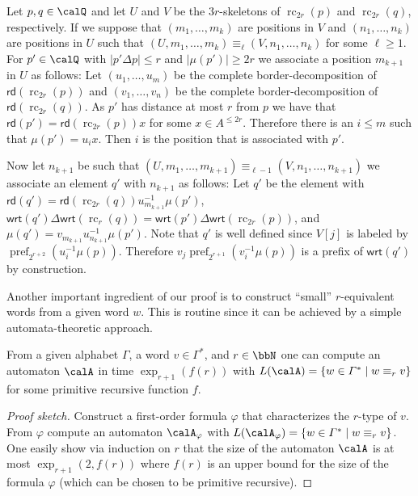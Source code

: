 \documentclass[a4paper,numberwithinsect,USenglish]{lipics-v2018}
\theoremstyle{plain}
\theoremstyle{remark}
\DeclareMathOperator{\pref}{pref}
\DeclareMathOperator{\cpr}{rc}
\newcommand{\rd}[1]{\mathsf{rd}(#1)}
\newcommand{\wrt}[1]{\mathsf{wrt}(#1)}
\newcommand{\Qx}{\calQ}
\newcommand{\mddl}[1]{\mu(#1)}
\renewcommand{\phi}{\varphi}
\renewcommand{\Gamma}{\varGamma}
\begin{document}
\begin{definition}
	Let $p,q\in \Qx$ and let $U$ and $V$ be the $3r$-skeletons of $\cpr_{2r}(p)$ and $\cpr_{2r}(q)$, respectively. If we suppose that $(m_1,\ldots,m_k)$ are positions in $V$ and $(n_1,\ldots,n_k)$ are positions in $U$ such that $(U,m_1,\ldots,m_k) \equiv_{\ell} (V,n_1,\ldots,n_k)$ for some $\ell \geq 1$. For $p'\in \Qx$ with $|p'\Delta p| \leq r$ and $|\mu(p')| \geq 2r$ we associate a position $m_{k+1}$ in $U$ as follows:
	Let $(u_1,\ldots, u_m)$ be the complete border-decomposition of $\rd{\cpr_{2r}(p)}$ and $(v_1,\ldots,v_n)$ be the complete border-decomposition of $\rd{\cpr_{2r}(q)}$. As $p'$ has distance at most $r$ from $p$ we have that $\rd{p'} = \rd{\cpr_{2r}(p)}x$
	for some $x\in A^{\leq 2r}$. Therefore there is an $i\leq m$ such that $\mddl{p'} = u_ix$. Then $i$ is the position that is associated with $p'$.
	
	Now let $n_{k+1}$ be such that $(U,m_1,\ldots,m_{k+1}) \equiv_{\ell-1} (V,n_1,\ldots,n_{k+1})$ we associate an element $q'$ with $n_{k+1}$ as follows:
	Let $q'$ be the element with $\rd{q'} = \rd{\cpr_{2r}(q)}u_{m_{k+1}}^{-1}\mddl{p'}$, $\wrt{q'}\Delta\wrt{\cpr_r({q})} = \wrt{p'}\Delta\wrt{\cpr_{2r}({p})}$, and 
	$\mddl{q'} = v_{m_{k+1}}u_{n_{k+1}}^{-1}\mddl{p'}$. Note that $q'$ is well defined since $V[j]$ is labeled by $\pref_{2^{r+2}}(u_i^{-1}\mddl{p})$. Therefore $v_j\pref_{2^{r+1}}(v_i^{-1}\mddl{p})$ is a prefix of $\wrt{q'}$ by construction.
\end{definition}

Another important ingredient of our proof is to construct ``small'' $r$-equivalent words from a given word $w$. This is routine since it can be achieved by a simple automata-theoretic approach.
\begin{lemma}\label{lem:r-equiv_word_construction}
	From a given alphabet $\Gamma$, a word $v\in\Gamma^\ast$, and $r\in\bbN$ one can compute an automaton $\calA$ in time $\exp_{r+1}(f(r))$ with $L(\calA) = \{w\in \Gamma^\ast\mid w\equiv_r v \}$ for some primitive recursive function $f$.
\end{lemma}
\begin{proof}[Proof sketch]
	Construct a first-order formula $\phi$ that characterizes the $r$-type of $v$. From $\phi$ compute an automaton $\calA_\phi$ with $L(\calA_\phi) = \{ w\in\Gamma^\ast \mid w\equiv_r v \}$. One easily show via induction on $r$ that the size of the automaton $\calA$ is at most
	$\exp_{r+1}(2, f(r))$ where $f(r)$ is an upper bound for the size of the formula $\phi$ (which can be chosen to be primitive recursive).
\end{proof}
\end{document}
